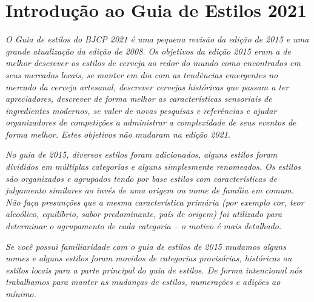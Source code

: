 \section*{Introdução ao Guia de Estilos 2021}
\textit{O Guia de estilos do BJCP 2021 é uma pequena revisão da edição de 2015 e uma grande atualização da edição de 2008. Os objetivos da edição 2015 eram a de melhor descrever os estilos de cerveja ao redor do mundo como encontrados em seus mercados locais, se manter em dia com as tendências emergentes no mercado da cerveja artesanal, descrever cervejas históricas que passam a ter apreciadores, descrever de forma melhor as características sensoriais de ingredientes modernos, se valer de novas pesquisas e referências e ajudar organizadores de competições a administrar a complexidade de seus eventos de forma melhor. Estes objetivos não mudaram na edição 2021.}

\textit{No guia de 2015, diversos estilos foram adicionados, alguns estilos foram divididos em múltiplas categorias e alguns simplesmente renomeados. Os estilos são organizados e agrupados tendo por base estilos com características de julgamento similares ao invés de uma origem ou nome de família em comum. Não faça presunções que a mesma característica primária (por exemplo cor, teor alcoólico, equilíbrio, sabor predominante, país de origem) foi utilizado para determinar o agrupamento de cada categoria – o motivo é mais detalhado.}

\textit{Se você possui familiaridade com o guia de estilos de 2015 mudamos alguns nomes e alguns estilos foram movidos de categorias provisórias, históricas ou estilos locais para a parte principal do guia de estilos. De forma intencional nós trabalhamos para manter as mudanças de estilos, numerações e adições ao mínimo.}